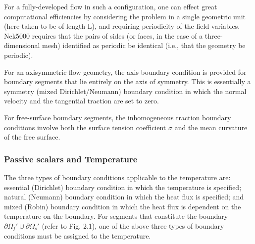 %
%
For a fully-developed flow in such a configuration, one can
effect great computational efficiencies by considering the
problem in a single geometric unit (here taken to be of
length L), and requiring periodicity of the field variables.
Nek5000 requires that the pairs of sides (or faces, in
the case of a three-dimensional mesh) identified as periodic
be identical (i.e., that the geometry be periodic).

For an axisymmetric flow geometry, the axis boundary
condition is provided for boundary segments that lie
entirely on the axis of symmetry.
This is essentially a symmetry (mixed Dirichlet/Neumann)
boundary condition
in which the normal velocity and the tangential traction
are set to zero.

For free-surface boundary segments, the inhomogeneous
traction boundary conditions
involve both the surface tension coefficient \(\sigma\)
and the mean curvature of the free surface.
\subsubsection{Passive scalars and Temperature}
  
The three types of boundary conditions applicable to the
temperature are: essential (Dirichlet) boundary
condition in which the temperature is specified;
natural (Neumann) boundary condition in which the heat flux
is specified; and mixed (Robin) boundary condition
in which the heat flux is dependent on the temperature
on the boundary.
For segments that constitute the boundary
\(\partial \Omega_f' \cup \partial \Omega_s'\) (refer to Fig. 2.1),
one of the above three types of boundary conditions must be
assigned to the temperature.

